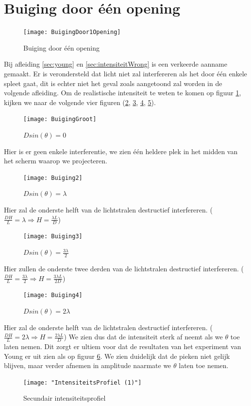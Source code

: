 \documentclass[a4paper,kul]{kulakarticle} %
\begin{document}
\section{Buiging door één opening}
\label{sec:RealiteitBuiging}
\begin{figure}[!h]
	\centering
	\texttt{[image: BuigingDoor1Opening]}
	\caption[Buiging door 1 opening]{Buiging door één opening}
	\label{fig:buigingdoor1opening}
\end{figure}
Bij afleiding \ref{sec:young} en \ref{sec:intensiteitWrong} is een verkeerde aanname gemaakt. Er is verondersteld dat licht niet zal interfereren als het door één enkele spleet gaat, dit is echter niet het geval zoals aangetoond zal worden in de volgende afleiding. Om de realistische intensiteit te weten te komen op figuur \ref{fig:buigingdoor1opening}, kijken we naar de volgende vier figuren (\ref{fig:buiging1}, \ref{fig:buiging2}, \ref{fig:buiging3}, \ref{fig:buiging4}). 
\begin{figure}[!h]
	\centering
	\texttt{[image: BuigingGroot]}
	\caption[Buiging 1]{$Dsin(\theta)=0$}
	\label{fig:buiging1}
\end{figure}
Hier is er geen enkele interferentie, we zien één heldere plek in het midden van het scherm waarop we projecteren.
\newpage
\begin{figure}[!h]
	\centering
	\texttt{[image: Buiging2]}
	\caption[Buiging 2]{$Dsin(\theta)=\lambda$}
	\label{fig:buiging2}
\end{figure}
Hier zal de onderste helft van de lichtstralen destructief interfereren. ($ \frac{DH}{L}=\lambda\Rightarrow H=\frac{\lambda L}{D}$)
\begin{figure}[!h]
	\centering
	\texttt{[image: Buiging3]}
	\caption[Buiging 3]{$Dsin(\theta)=\frac{3\lambda}{2}$}
	\label{fig:buiging3}
\end{figure}
Hier zullen de onderste twee derden van de lichtstralen destructief interfereren. ($ \frac{DH}{L}=\frac{3\lambda}{2}\Rightarrow H=\frac{3\lambda L}{2D}$)
\newpage
\begin{figure}[!h]
	\centering
	\texttt{[image: Buiging4]}
	\caption[Buiging 4]{$Dsin(\theta)=2\lambda$}
	\label{fig:buiging4}
\end{figure}
Hier zal de onderste helft van de lichtstralen destructief interfereren. ($ \frac{DH}{L}=2\lambda\Rightarrow H=\frac{2\lambda L}{D}$)
\newline
We zien dus dat de intensiteit sterk af neemt als we $\theta$ toe laten nemen. Dit zorgt er ultiem voor dat de resultaten van het experiment van Young er uit zien als op figuur \ref{fig:intensiteitsprofiel-1}. We zien duidelijk dat de pieken niet gelijk blijven, maar verder afnemen in amplitude naarmate we $\theta$ laten toe nemen. 
\begin{figure}[!h]
	\centering
	\texttt{[image: "IntensiteitsProfiel (1)"]}
	\caption[Intensiteitsprofiel]{Secundair intensiteitsprofiel}
	\label{fig:intensiteitsprofiel-1}
\end{figure}
\newpage
\end{document}
